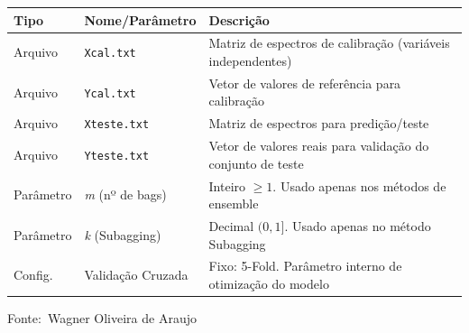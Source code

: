 \documentclass[12pt,a4paper]{article}
\newcommand{\oautor}{Wagner Oliveira de Araujo}
\begin{document}
\begin{quadro}[ht]
\begin{center}
\small
\caption{Entradas necessárias para execução do sistema}
\label{quadro:entradas}
\begin{threeparttable}
\begin{tabularx}{\textwidth}{|l|l|X|} \hline
\textbf{Tipo} & \textbf{Nome/Parâmetro} & \textbf{Descrição} \\ \hline
Arquivo & \texttt{Xcal.txt} & Matriz de espectros de calibração (variáveis independentes) \\ \hline
Arquivo & \texttt{Ycal.txt} & Vetor de valores de referência para calibração \\ \hline
Arquivo & \texttt{Xteste.txt} & Matriz de espectros para predição/teste \\ \hline
Arquivo & \texttt{Yteste.txt} & Vetor de valores reais para validação do conjunto de teste \\ \hline
Parâmetro & \textit{m} (nº de bags) & Inteiro $\ge 1$. Usado apenas nos métodos de ensemble \\ \hline
Parâmetro & \textit{k} (Subagging) & Decimal $(0, 1]$. Usado apenas no método Subagging \\ \hline
Config. & Validação Cruzada & Fixo: 5-Fold. Parâmetro interno de otimização do modelo \\ \hline
\end{tabularx}
\begin{tablenotes}[flushleft]
\footnotesize
\item Fonte:~\oautor
\end{tablenotes}
\end{threeparttable}
\end{center}
\end{quadro}
\end{document}

